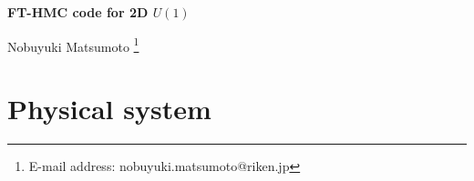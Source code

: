 \documentclass[12pt]{article}
\begin{document}
\begin{titlepage}
  \renewcommand{\thefootnote}{\fnsymbol{footnote}}
  \vspace*{1.0cm}

\begin{center}
  {\Large \bf
    FT-HMC code for 2D $U(1)$
  }
  \vspace{1.0cm}

  \centerline{
    {Nobuyuki Matsumoto}%
    \footnote{E-mail address: 
      nobuyuki.matsumoto@riken.jp}
  }

  \vskip 1.2cm

  \end{center}

  \begin{abstract}
    Brief description of the code.
    Many features mimic the qlat \cite{qlat}.
  \end{abstract}
\end{titlepage}

\pagestyle{empty}
\pagestyle{plain}

\tableofcontents
\setcounter{footnote}{0}

\section{Physical system}
\label{sec:sys}
\end{document}
